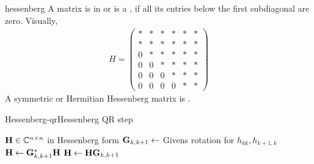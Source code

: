 \begin{Definition}{hessenberg}
  A matrix is in  or is a , if all its entries below the first subdiagonal are zero. Visually,
  \begin{gather}
    H =
    \begin{pmatrix}
      *&*&*&*&*&*\\
      *&*&*&*&*&*\\
      0&*&*&*&*&*\\
      0&0&*&*&*&*\\
      0&0&0&*&*&*\\
      0&0&0&0&*&*
    \end{pmatrix}
  \end{gather}
  A symmetric or Hermitian Hessenberg matrix is .
\end{Definition}

\begin{Algorithm*}{Hessenberg-qr}{Hessenberg QR step}
  \begin{algorithmic}[1]
    \Require $\mathbf H\in\mathbb C^{n\times n}$ in Hessenberg form
    \State $\mathbf G_{k,k+1} \gets$ Givens rotation for $h_{kk},h_{k+1,k}$
    \State $\mathbf H\gets \mathbf G^*_{k,k+1}\mathbf H$
    \EndFor
    \Comment{$\matH = \matr\matq$}
    \State $\mathbf H\gets \mathbf H\mathbf G_{k,k+1}$
    \EndFor
  \end{algorithmic}
\end{Algorithm*}

